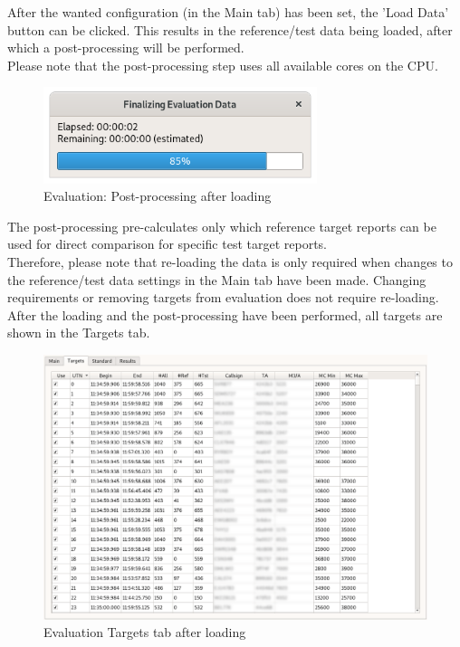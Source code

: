 After the wanted configuration (in the Main tab) has been set, the 'Load Data' button can be clicked. This results in the reference/test data being loaded, after which a post-processing will be performed. \\

Please note that the post-processing step uses all available cores on the CPU.

\begin{figure}[H]
  \centering 
    \includegraphics[width=8cm]{../screenshots/eval_post.png}
  \caption{Evaluation: Post-processing after loading}
\end{figure}

The post-processing pre-calculates only which reference target reports can be used for direct comparison for specific test target reports. \\

Therefore, please note that re-loading the data is only required when changes to the reference/test data settings in the Main tab have been made. Changing requirements or removing targets from evaluation does not require re-loading. \\

After the loading and the post-processing have been performed, all targets are shown in the Targets tab.

\begin{figure}[H]
  \hspace*{-2cm}
    \includegraphics[width=18cm,frame]{../screenshots/eval_targets.png}
  \caption{Evaluation Targets tab after loading}
\end{figure}

